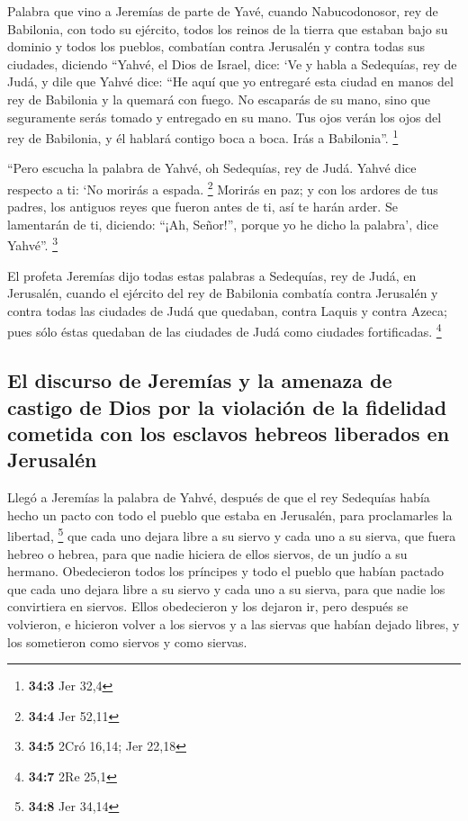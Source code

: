 \begin{paracol}{2}
 Palabra que vino a Jeremías de parte de Yavé, cuando
Nabucodonosor, rey de Babilonia, con todo su ejército, todos los reinos
de la tierra que estaban bajo su dominio y todos los pueblos, combatían
contra Jerusalén y contra todas sus ciudades, diciendo 
``Yahvé, el Dios de Israel, dice: `Ve y habla a Sedequías, rey de Judá,
y dile que Yahvé dice: ``He aquí que yo entregaré esta ciudad en manos
del rey de Babilonia y la quemará con fuego.  No escaparás
de su mano, sino que seguramente serás tomado y entregado en su mano.
Tus ojos verán los ojos del rey de Babilonia, y él hablará contigo boca
a boca. Irás a Babilonia''. \footnote{\textbf{34:3} Jer 32,4}

 ``Pero escucha la palabra de Yahvé, oh Sedequías, rey de
Judá. Yahvé dice respecto a ti: `No morirás a espada. \footnote{\textbf{34:4}
  Jer 52,11}  Morirás en paz; y con los ardores de tus
padres, los antiguos reyes que fueron antes de ti, así te harán arder.
Se lamentarán de ti, diciendo: ``¡Ah, Señor!'', porque yo he dicho la
palabra', dice Yahvé''. \footnote{\textbf{34:5} 2Cró 16,14; Jer 22,18}

 El profeta Jeremías dijo todas estas palabras a
Sedequías, rey de Judá, en Jerusalén,  cuando el ejército
del rey de Babilonia combatía contra Jerusalén y contra todas las
ciudades de Judá que quedaban, contra Laquis y contra Azeca; pues sólo
éstas quedaban de las ciudades de Judá como ciudades fortificadas.
\footnote{\textbf{34:7} 2Re 25,1}

\hypertarget{el-discurso-de-jeremuxedas-y-la-amenaza-de-castigo-de-dios-por-la-violaciuxf3n-de-la-fidelidad-cometida-con-los-esclavos-hebreos-liberados-en-jerusaluxe9n}{%
\subsection{El discurso de Jeremías y la amenaza de castigo de Dios por
la violación de la fidelidad cometida con los esclavos hebreos liberados
en
Jerusalén}\label{el-discurso-de-jeremuxedas-y-la-amenaza-de-castigo-de-dios-por-la-violaciuxf3n-de-la-fidelidad-cometida-con-los-esclavos-hebreos-liberados-en-jerusaluxe9n}}

 Llegó a Jeremías la palabra de Yahvé, después de que el
rey Sedequías había hecho un pacto con todo el pueblo que estaba en
Jerusalén, para proclamarles la libertad, \footnote{\textbf{34:8} Jer
  34,14}  que cada uno dejara libre a su siervo y cada uno
a su sierva, que fuera hebreo o hebrea, para que nadie hiciera de ellos
siervos, de un judío a su hermano.  Obedecieron todos los
príncipes y todo el pueblo que habían pactado que cada uno dejara libre
a su siervo y cada uno a su sierva, para que nadie los convirtiera en
siervos. Ellos obedecieron y los dejaron ir,  pero
después se volvieron, e hicieron volver a los siervos y a las siervas
que habían dejado libres, y los sometieron como siervos y como siervas.


\end{paracol}
